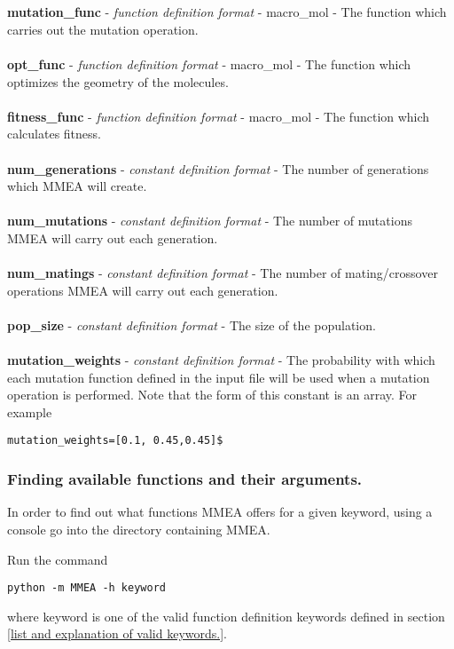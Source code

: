 \documentclass{article}
\begin{document}
\\
\\
\textbf{mutation\_func} - \textit{function definition format} - macro\_mol - The function which carries out the mutation operation.
\\
\\
\textbf{opt\_func} - \textit{function definition format} - macro\_mol - The function which optimizes the geometry of the molecules.
\\
\\
\textbf{fitness\_func} - \textit{function definition format} - macro\_mol - The function which calculates fitness.
\\
\\
\textbf{num\_generations} - \textit{constant definition format} - The number of generations which MMEA will create.
\\
\\
\textbf{num\_mutations} - \textit{constant definition format} - The number of mutations MMEA will carry out each generation.
\\
\\
\textbf{num\_matings} - \textit{constant definition format} - The number of mating/crossover operations MMEA will carry out each generation.
\\
\\
\textbf{pop\_size} - \textit{constant definition format} - The size of the population.
\\
\\
\textbf{mutation\_weights} - \textit{constant definition format} - The probability with which each mutation function defined in the input file will be used when a mutation operation is performed. Note that the form of this constant is an array. For example
\begin{verbatim}
mutation_weights=[0.1, 0.45,0.45]$
\end{verbatim}

\subsubsection{Finding available functions and their arguments.}
In order to find out what functions MMEA offers for a given keyword, using a console go into the directory containing MMEA. 

Run the command 
\begin{verbatim}
python -m MMEA -h keyword
\end{verbatim}
where keyword is one of the valid function definition keywords defined in section \ref{list and explanation of valid keywords.}.
\end{document}
